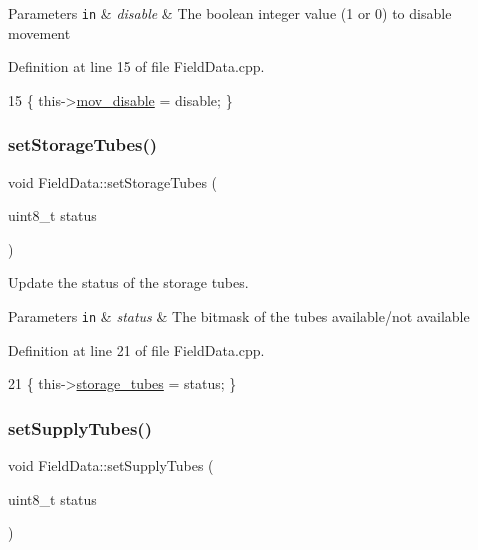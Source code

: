 \begin{DoxyParams}[1]{Parameters}
\mbox{\tt in}  & {\em disable} & The boolean integer value (1 or 0) to disable movement \\
\hline
\end{DoxyParams}


Definition at line 15 of file Field\+Data.\+cpp.


\begin{DoxyCode}
15 \{ this->\hyperlink{class_field_data_a82ed3c6771df262aae42cb332ccc7d0c}{mov\_disable} = disable; \}
\end{DoxyCode}
\mbox{\label{class_field_data_a00f9ea01f43a5d261962df7d87da7a74}} 
\subsubsection{\texorpdfstring{set\+Storage\+Tubes()}{setStorageTubes()}}
{\footnotesize\ttfamily void Field\+Data\+::set\+Storage\+Tubes (\begin{DoxyParamCaption}\item[{uint8\+\_\+t}]{status }\end{DoxyParamCaption})}



Update the status of the storage tubes. 


\begin{DoxyParams}[1]{Parameters}
\mbox{\tt in}  & {\em status} & The bitmask of the tubes available/not available \\
\hline
\end{DoxyParams}


Definition at line 21 of file Field\+Data.\+cpp.


\begin{DoxyCode}
21 \{ this->\hyperlink{class_field_data_a215428022f049a8f0b6702783291b636}{storage\_tubes} = status; \}
\end{DoxyCode}
\mbox{\label{class_field_data_a4dcddb152c65524e6c51ec74737f0c66}} 
\subsubsection{\texorpdfstring{set\+Supply\+Tubes()}{setSupplyTubes()}}
{\footnotesize\ttfamily void Field\+Data\+::set\+Supply\+Tubes (\begin{DoxyParamCaption}\item[{uint8\+\_\+t}]{status }\end{DoxyParamCaption})}



